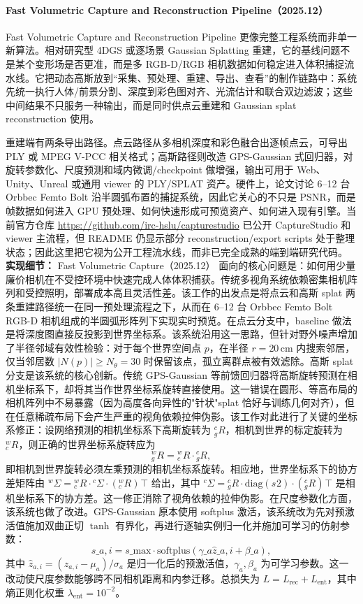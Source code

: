 \paragraph{Fast Volumetric Capture and Reconstruction Pipeline（2025.12）\cite{2512_15719}}
Fast Volumetric Capture and Reconstruction Pipeline 更像完整工程系统而非单一新算法。相对研究型 4DGS 或逐场景 Gaussian Splatting 重建，它的基线问题不是某个变形场是否更准，而是多 RGB-D/RGB 相机数据如何稳定进入体积捕捉流水线。它把动态高斯放到“采集、预处理、重建、导出、查看”的制作链路中：系统先统一执行人体/前景分割、深度到彩色图对齐、光流估计和联合双边滤波；这些中间结果不只服务一种输出，而是同时供点云重建和 Gaussian splat reconstruction 使用。

重建端有两条导出路径。点云路径从多相机深度和彩色融合出逐帧点云，可导出 PLY 或 MPEG V-PCC 相关格式；高斯路径则改造 GPS-Gaussian 式回归器，对旋转参数化、尺度预测和域内微调/checkpoint 做增强，输出可用于 Web、Unity、Unreal 或通用 viewer 的 PLY/SPLAT 资产。硬件上，论文讨论 6--12 台 Orbbec Femto Bolt 沿半圆弧布置的捕捉系统，因此它关心的不只是 PSNR，而是帧数据如何进入 GPU 预处理、如何快速形成可预览资产、如何进入现有引擎。当前官方仓库 \url{https://github.com/irc-hslu/capturestudio} 已公开 CaptureStudio 和 viewer 主流程，但 README 仍显示部分 reconstruction/export scripts 处于整理状态；因此这里把它视为公开工程流水线，而非已完全成熟的端到端研究代码。
\textbf{实现细节：} Fast Volumetric Capture（2025.12） 面向的核心问题是：如何用少量廉价相机在不受控环境中快速完成人体体积捕获。传统多视角系统依赖密集相机阵列和受控照明，部署成本高且灵活性差。该工作的出发点是将点云和高斯 splat 两条重建路径统一在同一预处理流程之下，从而在 6--12 台 Orbbec Femto Bolt RGB-D 相机组成的半圆弧形阵列下实现实时预览。在点云分支中，baseline 做法是将深度图直接反投影到世界坐标系。该系统沿用这一思路，但针对野外噪声增加了半径邻域有效性检验：对于每个世界空间点 $p$，在半径 $r = 20\,\mathrm{cm}$ 内搜索邻居，仅当邻居数 $|N(p)| \geq N_\theta = 30$ 时保留该点，孤立离群点被有效滤除。高斯 splat 分支是该系统的核心创新。传统 GPS-Gaussian 等前馈回归器将高斯旋转预测在相机坐标系下，却将其当作世界坐标系旋转直接使用。这一错误在圆形、等高布局的相机阵列中不易暴露（因为高度各向异性的"针状"splat 恰好与训练几何对齐），但在任意稀疏布局下会产生严重的视角依赖拉伸伪影。该工作对此进行了关键的坐标系修正：设网络预测的相机坐标系下高斯旋转为 ${_g^c R}$，相机到世界的标定旋转为 ${_c^w R}$，则正确的世界坐标系旋转应为 $${}_g^w R = {}_c^w R \cdot {}_g^c R,$$ 即相机到世界旋转必须左乘预测的相机坐标系旋转。相应地，世界坐标系下的协方差矩阵由 ${^w \Sigma} = {}_c^w R \cdot {}^c \Sigma \cdot ({}_c^w R)^{}\top$ 给出，其中 ${^c \Sigma} = {}_g^c R \cdot \mathrm{diag}(s^{}2) \cdot ({}_g^c R)^{}\top$ 是相机坐标系下的协方差。这一修正消除了视角依赖的拉伸伪影。在尺度参数化方面，该系统也做了改进。GPS-Gaussian 原本使用 softplus 激活，该系统改为先对预激活值施加双曲正切 $\tanh$ 有界化，再进行逐轴实例归一化并施加可学习的仿射参数： $$s\_{a,i} = s\_\text{max} \cdot \text{softplus}(\gamma\_a \hat{z}\_{a,i} + \beta\_a),$$ 其中 $\hat{z}_{a,i} = (z_{a,i} - \mu_a)/\sigma_a$ 是归一化后的预激活值，$\gamma_a, \beta_a$ 为可学习参数。这一改动使尺度参数能够跨不同相机距离和内参迁移。总损失为 $L = L_\mathrm{rec} + L_\mathrm{ent}$，其中熵正则化权重 $\lambda_\mathrm{ent} = 10^{-2}$。
